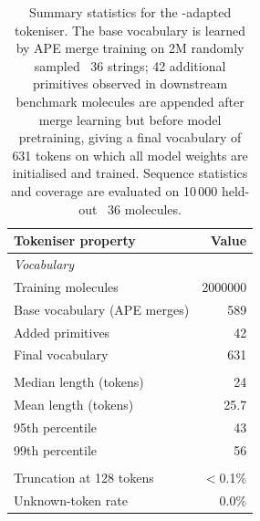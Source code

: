 
\begin{table}[htbp]
  \centering
  \small
  \begin{tabular}{l r}
    \toprule
    \textbf{Tokeniser property} & \textbf{Value} \\
    \midrule
    \multicolumn{2}{l}{\textit{Vocabulary}} \\
    Training molecules          & \num{2000000} \\
    Base vocabulary (APE merges) & 589 \\
    Added \selfies{} primitives  & 42 \\
    Final vocabulary             & 631 \\
    \addlinespace
    \multicolumn{2}{l}{\textit{Sequence statistics (10\,000 held-out \chembl{}~36 molecules)}} \\
    Median length (tokens)       & 24 \\
    Mean length (tokens)         & 25.7 \\
    95th percentile              & 43 \\
    99th percentile              & 56 \\
    \addlinespace
    \multicolumn{2}{l}{\textit{Coverage}} \\
    Truncation at 128 tokens     & $<$0.1\% \\
    Unknown-token rate           & 0.0\% \\
    \bottomrule
  \end{tabular}
  \caption{%
    Summary statistics for the \selfies{}-adapted \ape{} tokeniser.
    The base vocabulary is learned by APE merge training on 2M randomly
    sampled \chembl{}~36 \selfies{} strings; 42 additional \selfies{} primitives
    observed in downstream benchmark molecules are appended after merge
    learning but before model pretraining, giving a final vocabulary of
    631 tokens on which all model weights are initialised and trained.
    Sequence statistics and coverage are evaluated on 10\,000 held-out
    \chembl{}~36 molecules.
  }%
  \label{tab:tokeniser-stats}
\end{table}
